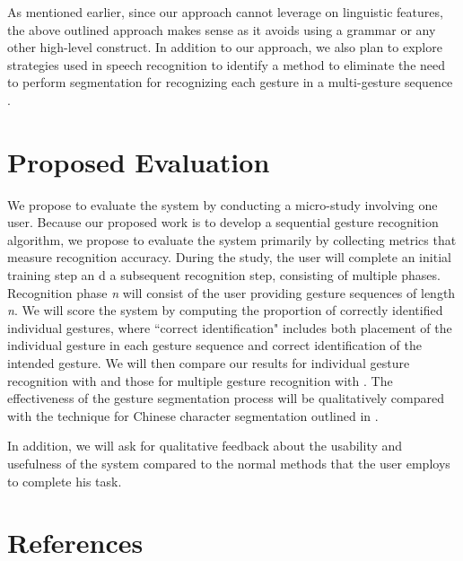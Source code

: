 \documentclass[twoside]{article}
\begin{document}
\begin{multicols}{2}
As mentioned earlier, since our approach cannot leverage on linguistic features, the above outlined approach makes sense as it avoids using a grammar or any other high-level construct. In addition to our approach, we also plan to explore strategies used in speech recognition to identify a method to eliminate the need to perform segmentation for recognizing each gesture in a multi-gesture sequence \cite{starner1994line}. 

\section{Proposed Evaluation}

We propose to evaluate the system by conducting a micro-study involving one
user. Because our proposed work is to develop a sequential gesture recognition
algorithm, we propose to evaluate the system primarily by collecting metrics
that measure recognition accuracy. During the study, the user will complete an
initial training step an d a subsequent recognition step, consisting of multiple
phases.
Recognition phase \emph{n} will consist of the user providing gesture sequences
of length \emph{n}. We will score the system by computing the proportion of correctly identified individual gestures, where ``correct identification" includes both placement of the individual gesture in each gesture sequence and correct identification of the intended gesture. We will then compare our results for individual gesture recognition with \cite{tanguay_jr_hidden_1995} and those for multiple gesture recognition with \cite{yang_gesture_1994}. The effectiveness of the gesture segmentation process will be qualitatively compared with the technique for Chinese character segmentation outlined in \cite{hong1998segmentation}.

In addition, we will ask for qualitative feedback about the usability and
usefulness of the system compared to the normal methods that the user employs to complete his task.

\section{References}

\begin{spacing}{0.9}
%
\begingroup
\renewcommand{\section}[2]{}%

\endgroup
\end{spacing}

\end{multicols}
\end{document}
